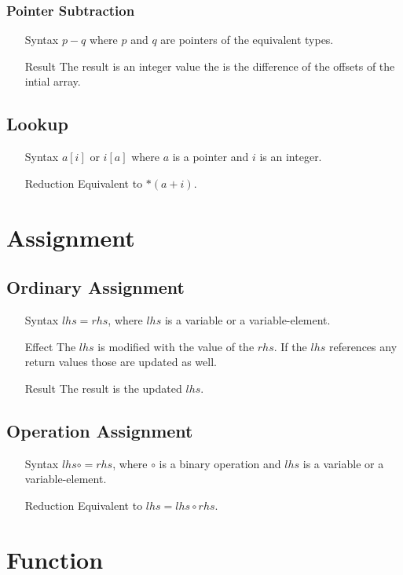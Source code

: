 \subsubsection{Pointer Subtraction}
\begin{itemize}
\item[Syntax] $p - q$ where $p$ and $q$ are pointers of the equivalent types.
\item[Result] The result is an integer value the is the difference of the offsets of the intial array.
\end{itemize}
\subsection{Lookup}
\begin{itemize}
\item[Syntax] $a[i]$ or $i[a]$ where $a$ is a pointer and $i$ is an integer.
\item[Reduction] Equivalent to $*\left(a + i\right)$.
\end{itemize}
\section{Assignment}
\subsection{Ordinary Assignment}
\begin{itemize}
\item[Syntax] $lhs = rhs$, where $lhs$ is a variable or a variable-element.
\item[Effect] The $lhs$ is modified with the value of the $rhs$. If the $lhs$ references any return values those are updated as well.
\item[Result] The result is the updated $lhs$.
\end{itemize}
\subsection{Operation Assignment}
\begin{itemize}
\item[Syntax] $lhs \circ= rhs$, where $\circ$ is a binary operation and $lhs$ is a variable or a variable-element.
\item[Reduction] Equivalent to $lhs = lhs \circ rhs$.
\end{itemize}
\section{Function}
